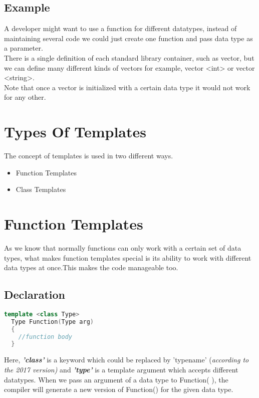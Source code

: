\documentclass[11pt,fleqn]{book} %
\begin{document}
\subsection{Example}
A developer might want to use a function for different datatypes, instead of maintaining several code we could just create one function and pass data type as a parameter.\\
There is a single definition of each standard library container, such as vector, but we can define many different kinds of vectors for example, vector <int> or vector <string>.\\
Note that once a vector is initialized with a certain data type it would not work for any other.

\section{Types Of Templates}

The concept of templates is used in two different ways.\\
\begin{itemize}
\item Function Templates 
\item Class Templates
\end{itemize}

\section{Function Templates}

As we know that normally functions can only work with a certain set of data types, what makes function templates special is its ability to work with different data types at once.This makes the code manageable too.
\newpage
\subsection{Declaration}
\begin{lstlisting}[language=C++, caption= Declaration Of Function Templates]
  template <class Type>
  Type Function(Type arg)
  {
    //function body
  }
\end{lstlisting}

Here, \textbf{\textit{'class'}} is a keyword which could be replaced by 'typename' {(\it{according to the 2017 version})} and \textbf{\textit{'type'}} is a template argument which accepts different datatypes. When we pass an argument of a data type to Function( ), the compiler will generate a new version of Function() for the given data type.\\
\end{document}
